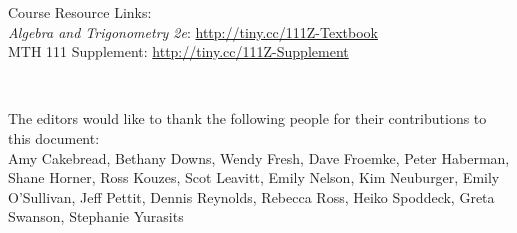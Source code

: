 Course Resource Links:\\
{\it Algebra and Trigonometry 2e}:  \href{http://tiny.cc/111Z-Textbook}{http://tiny.cc/111Z-Textbook}\\
MTH 111 Supplement: \href{http://tiny.cc/111Z-Supplement}{http://tiny.cc/111Z-Supplement}

~



The editors would like to thank the following people for their contributions to this document:\\
Amy Cakebread, Bethany Downs, Wendy Fresh, Dave Froemke, Peter Haberman, Shane Horner, Ross Kouzes, Scot Leavitt, Emily Nelson, Kim Neuburger, Emily O'Sullivan, Jeff Pettit, Dennis Reynolds, Rebecca Ross, Heiko Spoddeck, Greta Swanson, Stephanie Yurasits



\begin{quote}

% 

\end{quote}


\newpage
~